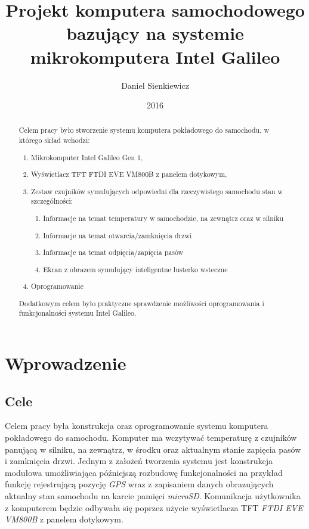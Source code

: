 \documentclass{xmgr}
\author   {Daniel Sienkiewicz}
\title    {Projekt komputera samochodowego bazujący na systemie mikrokomputera Intel Galileo}
\date     {2016}
\begin{document}
\begin{abstract}
Celem pracy było stworzenie systemu komputera pokładowego do samochodu, w którego skład wchodzi: 
\begin{enumerate}
	\item Mikrokomputer Intel Galileo Gen 1, 
	\item Wyświetlacz TFT FTDI EVE VM800B z panelem dotykowym, 
	\item Zestaw czujników symulujących odpowiedni dla rzeczywistego samochodu stan w szczególności:
	\begin{enumerate}
		\item Informacje na temat temperatury w samochodzie, na zewnątrz oraz w silniku
		\item Informacje na temat otwarcia/zamknięcia drzwi
		\item Informacje na temat odpięcia/zapięcia pasów
		\item Ekran z obrazem symulujący inteligentne lusterko wsteczne
	\end{enumerate}
	\item Oprogramowanie
\end{enumerate}

Dodatkowym celem było praktyczne sprawdzenie możliwości oprogramowania i funkcjonalności systemu Intel Galileo.

\end{abstract}
\maketitle

\chapter{Wprowadzenie}
\section{Cele}
Celem pracy była konstrukcja oraz oprogramowanie systemu komputera pokładowego do samochodu. Komputer ma wczytywać temperaturę z czujników panującą w silniku, na zewnątrz, w środku oraz aktualnym stanie zapięcia pasów i zamknięcia drzwi. Jednym z założeń tworzenia systemu jest konstrukcja modułowa umożliwiająca późniejszą rozbudowę funkcjonalności na przykład funkcję rejestrującą pozycję \emph{GPS} wraz z zapisaniem danych obrazujących aktualny stan samochodu na karcie pamięci \emph{microSD}. Komunikacja użytkownika z komputerem będzie odbywała się poprzez użycie wyświetlacza TFT \emph{FTDI EVE VM800B} z panelem dotykowym.
\end{document}
